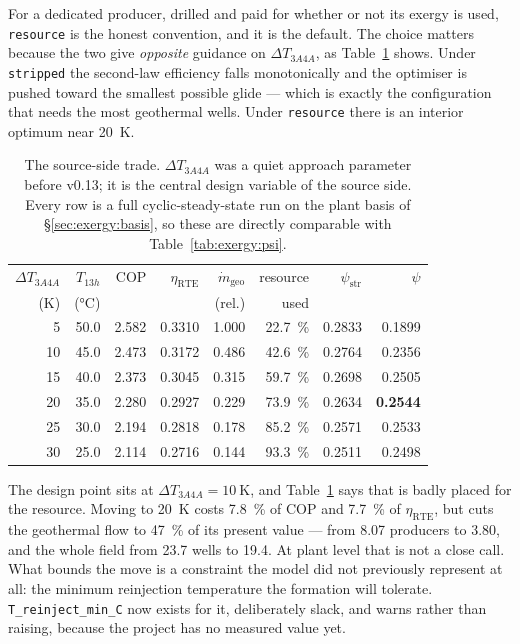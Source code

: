 For a dedicated producer, drilled and paid for whether or not its exergy is
used, \texttt{resource} is the honest convention, and it is the default. The
choice matters because the two give \emph{opposite} guidance on
$\Delta T_{3A4A}$, as Table~\ref{tab:exergy:dt3a4a} shows. Under
\texttt{stripped} the second-law efficiency falls monotonically and the
optimiser is pushed toward the smallest possible glide --- which is exactly
the configuration that needs the most geothermal wells. Under
\texttt{resource} there is an interior optimum near \SI{20}{\kelvin}.

\begin{table}[htbp]
  \centering
  \caption{The source-side trade. $\Delta T_{3A4A}$ was a quiet approach
  parameter before v0.13; it is the central design variable of the source
  side. Every row is a full cyclic-steady-state run on the plant basis of
  \S\ref{sec:exergy:basis}, so these are directly comparable with
  Table~\ref{tab:exergy:psi}.}
  \label{tab:exergy:dt3a4a}
  \begin{tabular}{rrrrrrrr}
    \toprule
    $\Delta T_{3A4A}$ & $T_{13h}$ & COP & $\eta_{\mathrm{RTE}}$ &
    $\dot m_{\mathrm{geo}}$ & resource & $\psi_{\mathrm{str}}$ & $\psi$ \\
    (K) & (\si{\celsius}) & & & (rel.) & used & & \\
    \midrule
     5 & 50.0 & 2.582 & 0.3310 & 1.000 & \SI{22.7}{\percent} & 0.2833 & 0.1899 \\
    10 & 45.0 & 2.473 & 0.3172 & 0.486 & \SI{42.6}{\percent} & 0.2764 & 0.2356 \\
    15 & 40.0 & 2.373 & 0.3045 & 0.315 & \SI{59.7}{\percent} & 0.2698 & 0.2505 \\
    20 & 35.0 & 2.280 & 0.2927 & 0.229 & \SI{73.9}{\percent} & 0.2634 & \textbf{0.2544} \\
    25 & 30.0 & 2.194 & 0.2818 & 0.178 & \SI{85.2}{\percent} & 0.2571 & 0.2533 \\
    30 & 25.0 & 2.114 & 0.2716 & 0.144 & \SI{93.3}{\percent} & 0.2511 & 0.2498 \\
    \bottomrule
  \end{tabular}
\end{table}

The design point sits at $\Delta T_{3A4A} = \SI{10}{\kelvin}$, and
Table~\ref{tab:exergy:dt3a4a} says that is badly placed for the resource.
Moving to \SI{20}{\kelvin} costs \SI{7.8}{\percent} of COP and
\SI{7.7}{\percent} of $\eta_{\mathrm{RTE}}$, but cuts the geothermal flow to
\SI{47}{\percent} of its present value --- from \num{8.07} producers to
\num{3.80}, and the whole field from \num{23.7} wells to \num{19.4}. At plant level that
is not a close call. What bounds the move is a constraint the model did not
previously represent at all: the minimum reinjection temperature the
formation will tolerate. \texttt{T\_reinject\_min\_C} now exists for it,
deliberately slack, and warns rather than raising, because the project has no
measured value yet.

